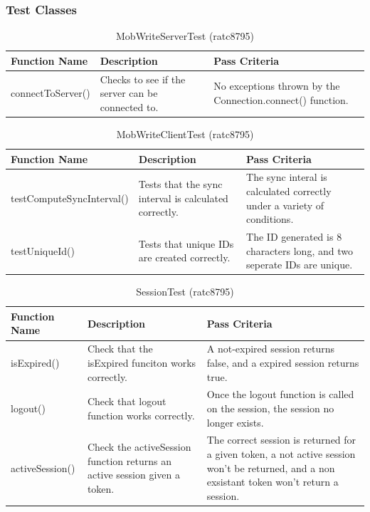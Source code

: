 \documentclass[twoside,letterpaper]{article}
\begin{document}
\subsubsection{Test Classes}


\begin{table}[h]
	\centering
	\caption{MobWriteServerTest (ratc8795)}
	\begin{tabular}{|p{4cm}|p{5cm}|p{6cm}|}
		\hline
		\textbf{Function Name} & \textbf{Description} & \textbf{Pass Criteria}  \\\hline
		connectToServer() & Checks to see if the server can be connected to. & No exceptions thrown by the Connection.connect() function.\\\hline
	\end{tabular}
\end{table}
\begin{table}[h]
	\centering
	\caption{MobWriteClientTest (ratc8795)}
	\begin{tabular}{|p{4cm}|p{5cm}|p{6cm}|}
		\hline
		\textbf{Function Name} & \textbf{Description} & \textbf{Pass Criteria}  \\\hline
		testComputeSyncInterval() & Tests that the sync interval is calculated correctly. & The sync interal is calculated correctly under a variety of conditions. \\\hline
		testUniqueId() & Tests that unique IDs are created correctly. & The ID generated is 8 characters long, and two seperate IDs are unique. \\\hline
	\end{tabular}
\end{table}
\begin{table}[h]
	\centering
	\caption{SessionTest (ratc8795)}
	\begin{tabular}{|p{4cm}|p{5cm}|p{6cm}|}
		\hline
		\textbf{Function Name} & \textbf{Description} & \textbf{Pass Criteria}  \\\hline
		isExpired() & Check that the isExpired funciton works correctly. & A not-expired session returns false, and a expired session returns true. \\\hline
		logout() & Check that logout function works correctly. & Once the logout function is called on the session, the session no longer exists. \\\hline
		activeSession() & Check the activeSession function returns an active session given a token. & The correct session is returned for a given token, a not active session won't be returned, and a non exsistant token won't return a session. \\\hline
	\end{tabular}
\end{table}
\end{document}
